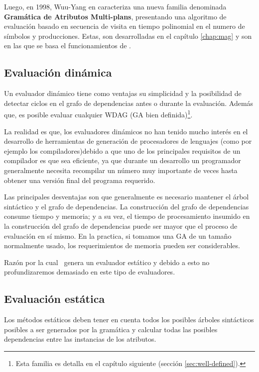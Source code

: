 Luego, en 1998, Wuu-Yang en \cite{wuu-yang1} caracteriza una nueva familia denominada \textbf{Gramática de Atributos Multi-plans}, presentando una algoritmo de evaluación basado en secuencia de visita en tiempo polinomial en el numero de símbolos y producciones. Estas, son desarrolladas en el capítulo \ref{chap:mag} y son en las que se basa el funcionamientos de \maggen.  

\subsection{Evaluación dinámica}

Un evaluador dinámico tiene como ventajas su simplicidad y la posibilidad de detectar ciclos en el grafo de dependencias antes o durante la evaluación. Además que, es posible evaluar cualquier WDAG (GA bien definida)\footnote{Esta familia es detalla en el capítulo siguiente (sección \ref{sec:well-defined}).}.

La realidad es que, los evaluadores dinámicos no han tenido mucho interés en el desarrollo de herramientas de generación de procesadores de lenguajes (como por ejemplo los compiladores)debido a que uno de los principales requisitos de un compilador es que sea eficiente, ya que durante un desarrollo un programador generalmente necesita recompilar un número muy importante de veces hasta obtener una versión final del programa requerido.

Las principales desventajas son que generalmente es necesario mantener el árbol sintáctico y el grafo de dependencias. La construcción del grafo de dependencias consume tiempo y memoria; y a su vez, el tiempo de procesamiento insumido en la construcción del grafo de dependencias puede ser mayor que el proceso de evaluación en sí mismo. En la practica, si tomamos una GA de un tamaño normalmente usado, los requerimientos de memoria pueden ser considerables.  

Razón por la cual \maggen\ genera un evaluador estático y debido a esto no profundizaremos demasiado en este tipo de evaluadores.

\subsection{Evaluación estática}
\label{subsec:eval-est}
Los métodos estáticos deben tener en cuenta todos los posibles árboles sintácticos posibles a ser generados por la gramática y calcular todas las posibles dependencias entre las instancias de los atributos. 

